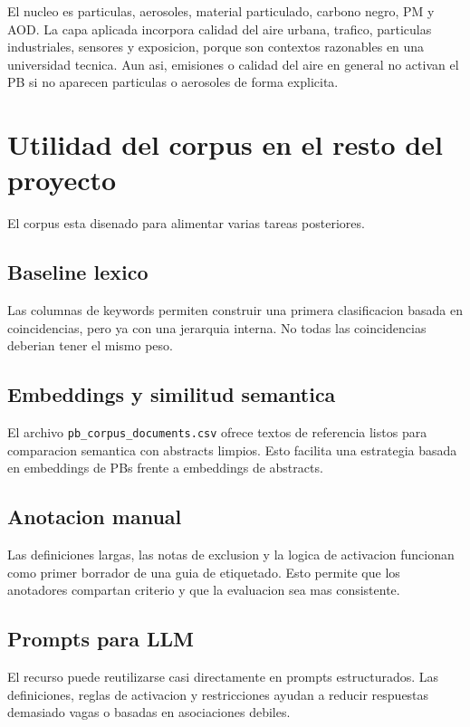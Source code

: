 \documentclass[11pt,a4paper]{article}
\begin{document}
El nucleo es particulas, aerosoles, material particulado, carbono negro, PM y AOD. La capa aplicada incorpora calidad del aire urbana, trafico, particulas industriales, sensores y exposicion, porque son contextos razonables en una universidad tecnica. Aun asi, emisiones o calidad del aire en general no activan el PB si no aparecen particulas o aerosoles de forma explicita.

\section{Utilidad del corpus en el resto del proyecto}

El corpus esta disenado para alimentar varias tareas posteriores.

\subsection{Baseline lexico}

Las columnas de keywords permiten construir una primera clasificacion basada en coincidencias, pero ya con una jerarquia interna. No todas las coincidencias deberian tener el mismo peso.

\subsection{Embeddings y similitud semantica}

El archivo \texttt{pb\_corpus\_documents.csv} ofrece textos de referencia listos para comparacion semantica con abstracts limpios. Esto facilita una estrategia basada en embeddings de PBs frente a embeddings de abstracts.

\subsection{Anotacion manual}

Las definiciones largas, las notas de exclusion y la logica de activacion funcionan como primer borrador de una guia de etiquetado. Esto permite que los anotadores compartan criterio y que la evaluacion sea mas consistente.

\subsection{Prompts para LLM}

El recurso puede reutilizarse casi directamente en prompts estructurados. Las definiciones, reglas de activacion y restricciones ayudan a reducir respuestas demasiado vagas o basadas en asociaciones debiles.
\end{document}
